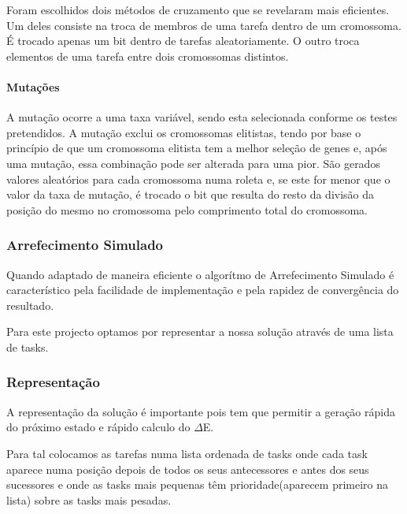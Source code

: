 \begin{titlepage}
Foram escolhidos dois métodos de cruzamento que se revelaram mais eficientes. Um deles consiste na troca de membros de uma tarefa dentro de um cromossoma. É trocado apenas um bit dentro de tarefas aleatoriamente. O outro troca elementos de uma tarefa entre dois cromossomas distintos.

\paragraph{Mutações}

A mutação ocorre a uma taxa variável, sendo esta selecionada conforme os testes pretendidos. A mutação exclui os cromossomas elitistas, tendo por base o princípio de que um cromossoma elitista tem a melhor seleção de genes e, após uma mutação, essa combinação pode ser alterada para uma pior. São gerados valores aleatórios para cada cromossoma numa roleta e, se este for menor que o valor da taxa de mutação, é trocado o bit que resulta do resto da divisão da posição do mesmo no cromossoma pelo comprimento total do cromossoma.


\subsubsection{Arrefecimento Simulado}
\justify\normalsize

Quando adaptado de maneira eficiente o algorítmo de Arrefecimento Simulado é característico pela facilidade de implementação e pela rapidez de convergência do resultado.

Para este projecto optamos por representar a nossa solução através de uma lista de tasks.

\subsubsection{Representação}
A representação da solução é importante pois tem que permitir a geração rápida do próximo estado e rápido calculo do 	$\Delta$E.

Para tal colocamos as tarefas numa lista ordenada de tasks onde cada task aparece numa posição depois de todos os seus antecessores e antes dos seus sucessores e onde as tasks mais pequenas têm prioridade(aparecem primeiro na lista) sobre as tasks mais pesadas.


\end{titlepage}
